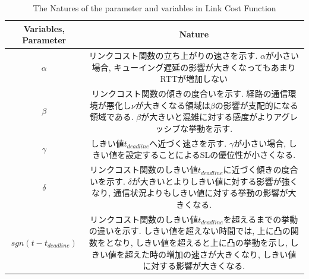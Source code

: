 \begin{table}[t]
    \begin{center}
    \begin{tabular}{|c|c|}
    \hline
    Variables, Parameter & Nature \\ \hline \hline
    $\alpha$ & \parbox{25zw}{リンクコスト関数の立ち上がりの速さを示す. $\alpha$が小さい場合,
    キューイング遅延の影響が大きくなってもあまりRTTが増加しない }\\ \hline
    $\beta$ & \parbox{25zw}{リンクコスト関数の傾きの度合いを示す.
    経路の通信環境が悪化し$\nu$が大きくなる領域は$\beta$の影響が支配的になる領域である.
    $\beta$が大きいと混雑に対する感度がよりアグレッシブな挙動を示す. } \\ \hline
    $\gamma$ & \parbox{25zw}{しきい値$t_{deadline}$へ近づく速さを示す. $\gamma$が小さい場合,
    しきい値を設定することによるSLの優位性が小さくなる. }\\ \hline
    $\delta$ &
    \parbox{25zw}{リンクコスト関数のしきい値$t_{deadline}$に近づく傾きの度合いを示す.
    $\delta$が大きいとよりしきい値に対する影響が強くなり, 通信状況よりもしきい値に対する挙動の影響が大きくなる.　} \\ \hline
    $sgn(t-t_{deadline})$ &
    \parbox{25zw}{リンクコスト関数のしきい値$t_{deadline}$を超えるまでの挙動の違いを示す. しきい値を超えない時間では,
    上に凸の関数をとなり, しきい値を超えると上に凸の挙動を示し, しきい値を超えた時の増加の速さが大きくなり, しきい値に対する影響が大きくなる. }
    \\
    \hline
    \end{tabular}
    \caption{The Natures of the parameter and variables in Link Cost Function}
    \label{table:link_cost_nature}
    \end{center}
\end{table}


